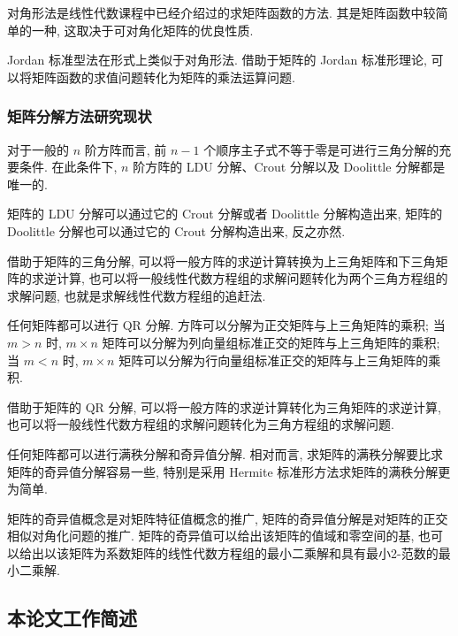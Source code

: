 \par 对角形法是线性代数课程中已经介绍过的求矩阵函数的方法. 其是矩阵函数中较简单的一种, 这取决于可对角化矩阵的优良性质.

\par Jordan 标准型法在形式上类似于对角形法. 借助于矩阵的 Jordan 标准形理论, 可以将矩阵函数的求值问题转化为矩阵的乘法运算问题.

\subsubsection{矩阵分解方法研究现状}

\par 对于一般的 $n$ 阶方阵而言, 前 $n-1$ 个顺序主子式不等于零是可进行三角分解的充要条件. 在此条件下, $n$ 阶方阵的 LDU 分解、Crout 分解以及 Doolittle 分解都是唯一的.

\par 矩阵的 LDU 分解可以通过它的 Crout 分解或者 Doolittle 分解构造出来, 矩阵的 Doolittle 分解也可以通过它的 Crout 分解构造出来, 反之亦然.

\par 借助于矩阵的三角分解, 可以将一般方阵的求逆计算转换为上三角矩阵和下三角矩阵的求逆计算, 也可以将一般线性代数方程组的求解问题转化为两个三角方程组的求解问题, 也就是求解线性代数方程组的追赶法.

\par 任何矩阵都可以进行 QR 分解. 方阵可以分解为正交矩阵与上三角矩阵的乘积; 当 $m > n$ 时, $m\times n$ 矩阵可以分解为列向量组标准正交的矩阵与上三角矩阵的乘积; 当 $m < n$ 时, $m\times n$ 矩阵可以分解为行向量组标准正交的矩阵与上三角矩阵的乘积.

\par 借助于矩阵的 QR 分解, 可以将一般方阵的求逆计算转化为三角矩阵的求逆计算, 也可以将一般线性代数方程组的求解问题转化为三角方程组的求解问题.

\par 任何矩阵都可以进行满秩分解和奇异值分解. 相对而言, 求矩阵的满秩分解要比求矩阵的奇异值分解容易一些, 特别是采用 Hermite 标准形方法求矩阵的满秩分解更为简单.

\par 矩阵的奇异值概念是对矩阵特征值概念的推广, 矩阵的奇异值分解是对矩阵的正交相似对角化问题的推广. 矩阵的奇异值可以给出该矩阵的值域和零空间的基, 也可以给出以该矩阵为系数矩阵的线性代数方程组的最小二乘解和具有最小2-范数的最小二乘解.

\subsection{本论文工作简述}

